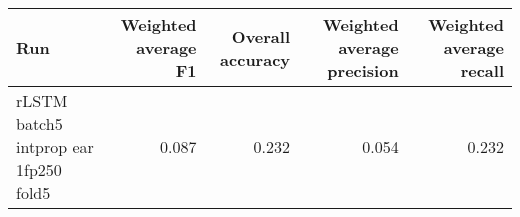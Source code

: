 \begin{tabular}{lrrrr}
\toprule
Run & Weighted average F1 & Overall accuracy & Weighted average precision & Weighted average recall \\
\midrule
rLSTM batch5 intprop ear 1fp250 fold5 & 0.087 & 0.232 & 0.054 & 0.232 \\
\bottomrule
\end{tabular}
